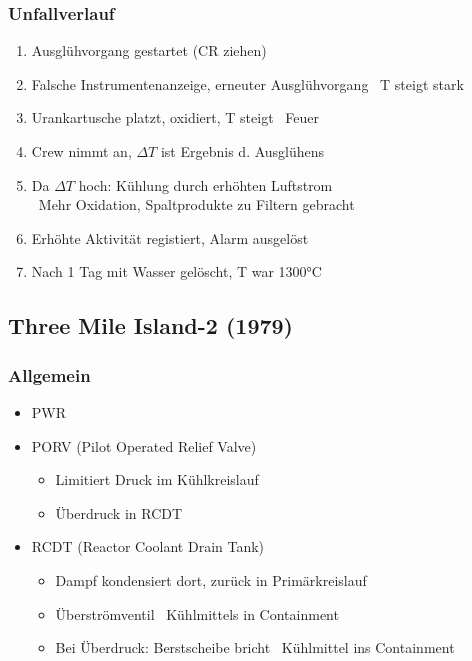 \documentclass[12pt]{article}
\begin{document}
\subsubsection{Unfallverlauf}
\begin{enumerate}
	\item Ausglühvorgang gestartet (CR ziehen)
	\item Falsche Instrumentenanzeige, erneuter Ausglühvorgang \textrightarrow\ T steigt stark
	\item Urankartusche platzt, oxidiert, T steigt \textrightarrow\ Feuer
	\item Crew nimmt an, \(\Delta T\) ist Ergebnis d. Ausglühens
	\item Da \(\Delta T\) hoch: Kühlung durch erhöhten Luftstrom\\
		\textrightarrow\ Mehr Oxidation, Spaltprodukte zu Filtern gebracht
	\item Erhöhte Aktivität registiert, Alarm ausgelöst
	\item Nach 1 Tag mit Wasser gelöscht, T war 1300°C
\end{enumerate}

\subsection{Three Mile Island-2 (1979)}

\subsubsection{Allgemein}
\begin{itemize}[noitemsep]
	\item PWR
	\item PORV (Pilot Operated Relief Valve)
		\begin{itemize}[noitemsep]
			\item Limitiert Druck im Kühlkreislauf
			\item Überdruck in RCDT
		\end{itemize}
	\item RCDT (Reactor Coolant Drain Tank)
		\begin{itemize}[noitemsep]
			\item Dampf kondensiert dort, zurück in Primärkreislauf
			\item Überströmventil \textrightarrow\ Kühlmittels in Containment
			\item Bei Überdruck: Berstscheibe bricht \textrightarrow\ Kühlmittel ins Containment
		\end{itemize}
\end{itemize}
\end{document}
